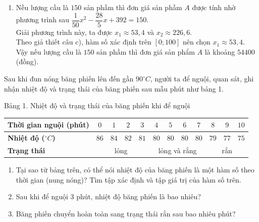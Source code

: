 \begin{bt}
{\begin{enumerate}[\bf a]
			Khi $x=100$ thì lượng cầu là  $y=f(100)=32$.
			\item Nều lượng cầu là $ 150 $ sản phầm thì đơn giá sản phầm $A$ được tính nhờ phương trình sau  $\dfrac{1}{50}x^2-\dfrac{28}{5}x+392=150$.\\
			Giải phương trình này, ta được $x_1 \approx 53{,}4$ và $x_2 \approx 226{,}6$.\\
			Theo giả thiết câu c), hàm số xác định trên $ [0; 100] $ nên chọn $x_1 \approx 53{,}4$.\\
			Vậy nếu lượng cầu là $ 150 $ sản phầm thì đơn giá sản phẩm $A$ là khoảng $ 54400 $ (đồng).
		\end{enumerate}
	}
\end{bt}

\begin{bt}%
	Sau khi đun nóng băng phiến lên đến gần $90^{\circ}C$, người ta để nguội, quan sát, ghi nhận nhiệt độ và trạng thái của băng phiến sau mẫu phút như bảng 1.
	\begin{center}
		Bảng 1. Nhiệt độ và trạng thái của băng phiến khi để nguội
		\begin{tabular}{|l|c|c|c|c|c|c|c|c|c|c|c|}
			\hline 
			\textbf{Thời gian nguội (phút)} & $0$ & $1$ & $2$ & $3$ & $4$ & $5$ & $6$ & $7$ & $8$ & $9$ & $10$ \\ 
			\hline 
			\textbf{Nhiệt độ ($^{\circ}C$)} & $86$ & $84$ & $82$ & $81$ & $80$ & $80$ & $80$  &$80$ & $79$ & $77$ & $75$ \\
			\hline
			\textbf{Trạng thái} & \multicolumn{4}{|c|}{lỏng} &\multicolumn{4}{|c|}{lỏng và rắng} & \multicolumn{3}{|c|}{rắn}\\
			\hline
		\end{tabular}
	\end{center}
	\begin{enumerate}
		\item Tại sao từ bảng trên, có thể nói nhiệt độ của băng phiến là một hàm số theo thời gian (nung nóng)? Tìm tập xác định và tập giá trị của hàm số trên.
		\item Sau khi để nguội $3$ phút, nhiệt độ băng phiến là bao nhiêu?
		\item Băng phiến chuyển hoàn toàn sang trạng thái rắn sau bao nhiêu phút?
	\end{enumerate}
\end{bt}
